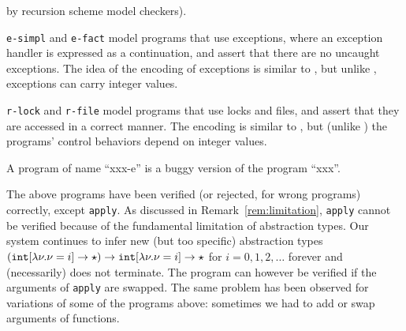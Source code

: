\begin{asparaitem}
by recursion scheme model checkers). 
\item \texttt{e-simpl} and \texttt{e-fact} model programs that use 
exceptions, where an exception handler is expressed as a continuation, 
and assert that there are no uncaught exceptions. The idea of the 
encoding of exceptions is similar to \cite{Kobayashi2009c}, but unlike 
\cite{Kobayashi2009c}, exceptions can carry integer values. 
\item \texttt{r-lock} and \texttt{r-file} model programs that use locks 
and files, and assert that they are accessed in a correct manner. The 
encoding is similar to \cite{Kobayashi2009}, but (unlike 
\cite{Kobayashi2009}) the programs' control behaviors depend on integer 
values.
\item A program of name ``xxx-e'' is a buggy version of the program 
``xxx''.
\end{asparaitem}

The above programs have been verified (or rejected, for wrong programs) 
correctly, except \texttt{apply}.
As discussed in Remark~\ref{rem:limitation}, \texttt{apply} cannot be 
verified because of the fundamental limitation of abstraction types. Our 
system continues to infer new (but too specific) abstraction types 
\((\mathtt{int}[\lambda \nu.\nu=i]\rightarrow \star)\rightarrow\mathtt{int}[\lambda \nu.\nu=i]\rightarrow 
\star\) for \(i=0,1,2,\ldots\) forever and (necessarily) does not 
terminate. The program can however be verified if the arguments of 
\texttt{apply} are swapped. The same problem has been observed for 
variations of some of the programs above: sometimes we had to add or 
swap arguments of functions.

